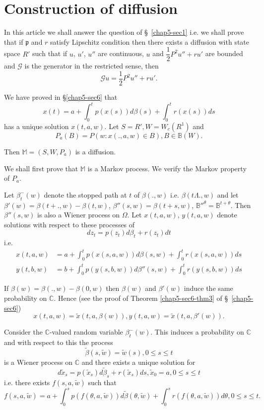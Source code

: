 \section{Construction of diffusion}\label{chap5-sec7}%

In this article we shall answer the question of \S\ \ref{chap5-sec1}
i.e. we shall 
prove that if $\mathfrak{p}$ and $r$ satisfy Lipschitz condition then
there exists a diffusion with state space $R'$ such that if $u$, $u'$,
$u''$ are continuous, $u$ and $\dfrac{1}{2}P^2 u'' + ru'$ are bounded
and $\mathscr{G}$ is the generator in the restricted sense, then 
$$
\mathscr{G} u = \frac{1}{2} P^2 u'' + ru'.
$$

We have proved in \S \ref{chap5-sec6} that
$$
x(t) = a + \int^t_0 p(x(s)) d \beta (s) + \int^t_0 r(x(s)) ds
$$\pageoriginale
has a unique solution $x(t, a, w)$. Let $S = R',  W = W_c (R^1)$ and 
$$
P_a (B) = P(w:x(.,a,w) \in B), B \in \mathbb{B} (W).
$$

Then $\mathbb{M} = (S, W, P_a)$ is a diffusion.

We shall first prove that $\mathbb{M}$ is a Markov process. We verify
the Markov property of $P_a$. 

Let $\beta^-_t (w)$ denote the stopped path at $t$ of $\beta (. , w)$
i.e. $\beta(t \Lambda.,w)$ and let $\beta'(w) = \beta (t + . ,
w) - \beta (t, w)$, $\beta''(s, w) = \beta (t + s, w)$,
${\mathbb{B}''}^{\theta} = \mathbb{B}^{t + \theta}$. 
Then $\beta''(s, w)$ is also
a Wiener process on $\Omega$. Let $x(t, a, w)$, $y(t, a, w)$ denote
solutions with respect to these processes of  
$$
dz_t = p(z_t) d \beta_t + r (z_t)dt
$$
i.e.
\begin{align*}
  x(t, a, w) &= a + \int^t_0 p(x(s, a, w)) d \beta (s, w) + \int^t_0
  r(x(s, a, w)) ds\\ 
  y(t, b, w) &= b + \int^t_0 p(y(s, b, w)) d \beta{''} (s, w) +
  \int^t_0  r (y(s, b, w))ds 
\end{align*}

If $\beta (w) = \beta (. , w) - \beta (0, w)$ then $\beta (w)$ and
$\beta{'}(w)$ induce the same probability on $\mathbb{C}$. Hence (see
the proof of Theorem \ref{chap5-sec6-thm3} of \S\ \ref{chap5-sec6}) 
$$
x(t, a, w) = \tilde{x}(t, a, \beta (w)), y(t, a, w) = \tilde{x} (t, a,
\beta{'} (w)). 
$$

Consider the $\mathbb{C}$-valued random variable $\beta^-_t
(w)$. This induces a probability on $\mathbb{C}$ and with respect to
this the process 
$$
\tilde{\beta}(s,\tilde{w}) =\tilde{w}(s), 0 \leq s \leq t
$$\pageoriginale
is a Wiener process on  $\mathbb{C}$ and there exists a unique solution for
$$
d\tilde{x}_s = p (\tilde{x}_s)d \tilde{\beta}_s + r(\tilde{x}_s)ds,
\tilde{x}_0 = a, 0 \leq s \leq t 
$$
i.e. there exists $f(s, a, \tilde{w})$ such that
$$
f(s, a, \tilde{w}) = a +  \int^s_0 p(f(\theta, a, \tilde{w})) d
\tilde{\beta} (\theta, \tilde{w}) +  \int^s_0 r(f (\theta , a,
\tilde{w}))d \theta, 0 \leq s \leq t. 
$$

